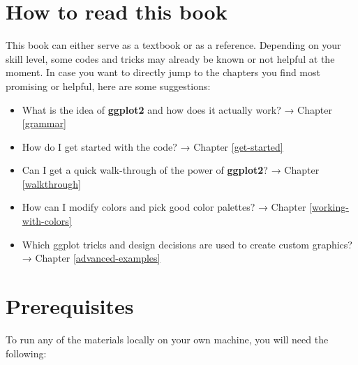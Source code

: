 \documentclass[
]{krantz}
\providecommand{\tightlist}{%
  \setlength{\itemsep}{0pt}\setlength{\parskip}{0pt}}
\begin{document}
\hypertarget{how-to-read-this-book}{%
\section*{How to read this book}\label{how-to-read-this-book}}


This book can either serve as a textbook or as a reference. Depending on your skill level, some codes and tricks may already be known or not helpful at the moment. In case you want to directly jump to the chapters you find most promising or helpful, here are some suggestions:

\begin{itemize}
\tightlist
\item
  What is the idea of \textbf{ggplot2} and how does it actually work? → Chapter \ref{grammar}
\item
  How do I get started with the code? → Chapter \ref{get-started}
\item
  Can I get a quick walk-through of the power of \textbf{ggplot2}? → Chapter \ref{walkthrough}
\item
  How can I modify colors and pick good color palettes? → Chapter \ref{working-with-colors}
\item
  Which ggplot tricks and design decisions are used to create custom graphics? → Chapter \ref{advanced-examples}
\end{itemize}

\hypertarget{prerequisites}{%
\section*{Prerequisites}\label{prerequisites}}


To run any of the materials locally on your own machine, you will need the following:
\end{document}
